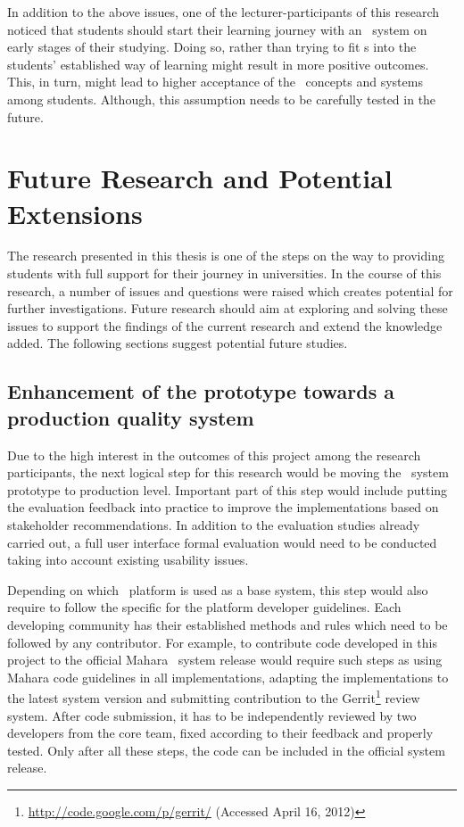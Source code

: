 In addition to the above issues, one of the lecturer-participants of this
research noticed that students should start their learning journey with an
\ep~system on early stages of their studying. Doing so, rather than trying to
fit \ep s into the students' established way of learning might result in more
positive outcomes. This, in turn, might lead to higher acceptance of the
\ep~concepts and systems among students. Although, this assumption needs to
be carefully tested in the future.

\section{Future Research and Potential Extensions}
The research presented in this thesis is one of the steps on the way to
providing students with full support for their \LLLs journey in universities. In
the course of this research, a number of issues and questions were raised which
creates potential for further investigations. Future research should aim at
exploring and solving these issues to support the findings of the current
research and extend the knowledge added. The following sections suggest
potential future studies.

\subsection[Enhancement of the prototype]{Enhancement of the prototype towards a
production quality system} 
Due to the high interest in the outcomes of this project among the research
participants, the next logical step for this research would be moving the
\ep~system prototype to production level. Important part of this step would
include putting the evaluation feedback into practice to improve the
implementations based on stakeholder recommendations. In addition to the
evaluation studies already carried out, a full user interface formal evaluation
would need to be conducted taking into account existing usability issues.

Depending on which \ep~platform is used as a base system, this step would also
require to follow the specific for the platform developer guidelines. Each
developing community has their established methods and rules which need to be
followed by any contributor. For example, to contribute code developed in this
project to the official Mahara \ep~system release would require such steps as
using Mahara code guidelines in all implementations, adapting the
implementations to the latest system version and submitting contribution to the
Gerrit\footnote{\url{http://code.google.com/p/gerrit/} (Accessed April 16,
2012)} review system. After code submission, it has to be independently reviewed
by two developers from the core team, fixed according to their feedback and
properly tested. Only after all these steps, the code can be included in the
official system release.

